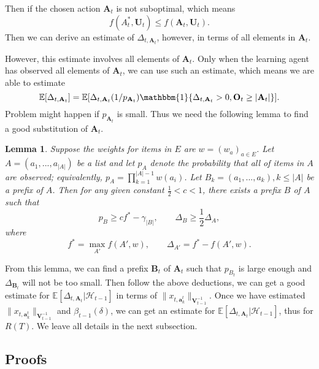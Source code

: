 \documentclass{article}
\newcommand{\EE}{\mathbb{E}}
\newcommand{\bOne}{\mathbbm{1}}
\newcommand{\bA}{\mathbf{A}}
\newcommand{\ba}{\mathbf{a}}
\newcommand{\bB}{\mathbf{B}}
\newcommand{\bO}{\mathbf{O}}
\newcommand{\bU}{\mathbf{U}}
\newcommand{\bV}{\mathbf{V}}
\newcommand{\cH}{\mathcal{H}}
\newcommand{\abs}[1]{\left| #1 \right|}
\newcommand{\norm}[1]{\| #1 \|}
\newtheorem{lemma}[theorem]{Lemma}%
\begin{document}
Then if the chosen action $\bA_t$ is not suboptimal, which means
$$
f(A_t^*, \bU_t) \leq f(\bA_t, \bU_t).
$$
Then we can derive an estimate of $\Delta_{t, \bA_t}$, however, in terms of all elements in $\bA_t$. 

However, this estimate involves all elements of $\bA_t$. Only when the learning agent has observed all elements of $\bA_t$, we can use such an estimate, which means we are able to estimate
$$
\EE[\Delta_{t, \bA_t}] = \EE[\Delta_{t, \bA_t}(1/p_{\bA_t}) \bOne\{\Delta_{t, \bA_t} > 0, \bO_t \geq \abs{\bA_t}\}].
$$
Problem might happen if $p_{\bA_t}$ is small. Thus we need the following lemma to find a good substitution of $\bA_t$.

\begin{lemma}
\label{lem:prefixExist}
Suppose the weights for items in $E$ are $w = (w_a)_{a \in E}$. Let $A = (a_1, ..., a_{\abs{A}})$ be a list and let $p_A$ denote the probability that all of items in $A$ are observed; equivalently, $p_A = \prod_{k=1}^{\abs{A}-1}w(a_i)$. Let $B_k = (a_1, ..., a_k), k \leq \abs{A}$ be a prefix of $A$. Then for any given constant $\frac{1}{2} < c < 1$, there exists a prefix $B$ of $A$ such that
$$
p_B \geq c f^* - \gamma_{\abs{B}}, \qquad \Delta_B \geq \frac{1}{2} \Delta_A,
$$
where
$$
f^* = \max_{A'} f(A', w), \qquad \Delta_{A'} = f^* - f(A', w).
$$
\end{lemma}

From this lemma, we can find a prefix $\bB_t$ of $\bA_t$ such that $p_{B_t}$ is large enough and $\Delta_{\bB_t}$ will not be too small. Then follow the above deductions, we can get a good estimate for $\EE[\Delta_{t, \bA_t}|\cH_{t-1}]$ in terms of $\norm{x_{t,\ba_k^t}}_{\bV_{t-1}^{-1}}$. Once we have estimated $\norm{x_{t,\ba_k^t}}_{\bV_{t-1}^{-1}}$ and $\beta_{t-1}(\delta)$, we can get an estimate for $\EE[\Delta_{t, \bA_t}|\cH_{t-1}]$, thus for $R(T)$. We leave all details in the next subsection.


\subsection{Proofs}
\end{document}
